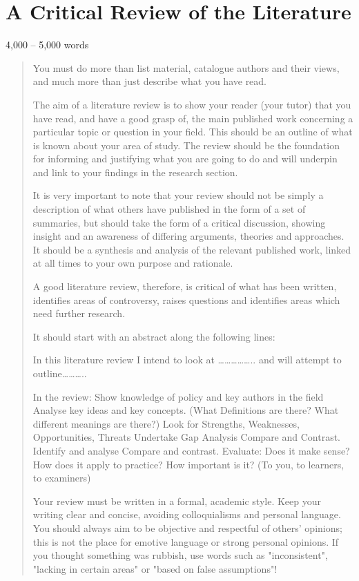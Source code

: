 \section{A Critical Review of the Literature}
4,000 – 5,000 words

\begin{quote}
You must do more than list material, catalogue authors and their views, and much more than just describe what you have read. 


The aim of a literature review is to show your reader (your tutor) that you have read, and have a good grasp of, the main published work concerning a particular topic or question in your field. This should be an outline of what is known about your area of study.  The review should be the foundation for informing and justifying what you are going to do and will underpin and link to your findings in the research section.

It is very important to note that your review should not be simply a description of what others have published in the form of a set of summaries, but should take the form of a critical discussion, showing insight and an awareness of differing arguments, theories and approaches. It should be a synthesis and analysis of the relevant published work, linked at all times to your own purpose and rationale.

A good literature review, therefore, is critical of what has been written, identifies areas of controversy, raises questions and identifies areas which need further research. 

It should start with an abstract along the following lines:

In this literature review I intend to look at …………….. and will attempt to outline………..

In the review:
Show knowledge of policy and key authors in the field
Analyse key ideas and key concepts. (What Definitions are there? What different meanings 	are there?)
Look for Strengths, Weaknesses, Opportunities, Threats
Undertake Gap Analysis
Compare and Contrast.
	Identify and analyse 
	Compare and contrast.
Evaluate: 
Does it make sense?
	How does it apply to practice?
How important is it? (To you, to learners, to examiners)

Your review must be written in a formal, academic style. Keep your writing clear and concise, avoiding colloquialisms and personal language. You should always aim to be objective and respectful of others' opinions; this is not the place for emotive language or strong personal opinions. If you thought something was rubbish, use words such as "inconsistent", "lacking in certain areas" or "based on false assumptions"! 


\end{quote}
